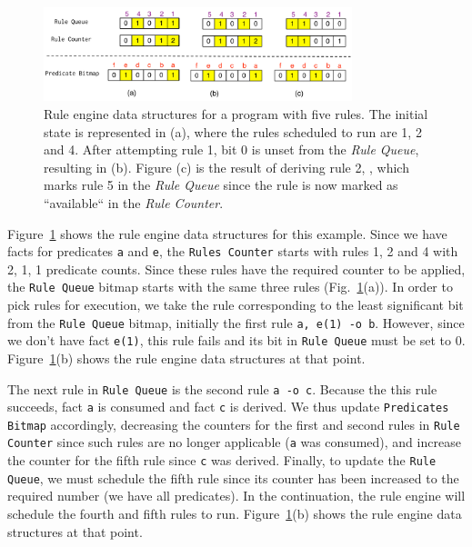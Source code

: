 \begin{figure}[t]
   \centering
   \includegraphics[width=0.8\textwidth]{figures/implementation/rule_queue.pdf}

   \caption{Rule engine data structures for a program with five rules. The
      initial state is represented in (a), where the rules scheduled to run are
      1, 2 and 4. After attempting rule 1, bit 0 is unset from the \emph{Rule
      Queue}, resulting in (b). Figure (c) is the result of deriving rule 2,
      , which marks rule 5 in the \emph{Rule Queue} since the rule
      is now marked as ``available`` in the \emph{Rule Counter}.}

   \label{fig:implementation:rule_engine}
\end{figure}

Figure~\ref{fig:implementation:rule_engine} shows the rule engine data
structures for this example. Since we have facts for predicates \texttt{a} and
\texttt{e}, the \texttt{Rules Counter} starts with rules 1, 2 and 4 with 2, 1, 1
predicate counts. Since these rules have the required counter to be applied, the
\texttt{Rule Queue} bitmap starts with the same three rules
(Fig.~\ref{fig:implementation:rule_engine}(a)). In order to pick rules for
execution, we take the rule corresponding to the least significant bit from the
\texttt{Rule Queue} bitmap, initially the first rule \texttt{a, e(1) -o b}.
However, since we don't have fact \texttt{e(1)}, this rule fails and its bit in
\texttt{Rule Queue} must be set to 0.
Figure~\ref{fig:implementation:rule_engine}(b) shows the rule engine data
structures at that point.

The next rule in \texttt{Rule Queue} is the second rule \texttt{a -o c}.
Because the this rule succeeds, fact \texttt{a} is consumed and fact \texttt{c}
is derived. We thus update \texttt{Predicates Bitmap} accordingly, decreasing
the counters for the first and second rules in \texttt{Rule Counter} since such
rules are no longer applicable (\texttt{a} was consumed), and increase the
counter for the fifth rule since \texttt{c} was derived. Finally, to update the
\texttt{Rule Queue}, we must schedule the fifth rule since its counter has been
increased to the required number (we have all predicates).  In the continuation,
the rule engine will schedule the fourth and fifth rules to run.
Figure~\ref{fig:implementation:rule_engine}(b) shows the rule engine data
structures at that point.

